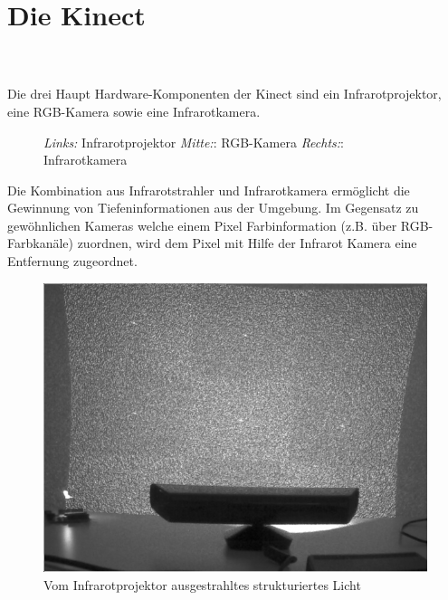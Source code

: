 \chapter{Die Kinect}
\label{ch:kinect}
\\\\
Die drei Haupt Hardware-Komponenten der Kinect sind ein Infrarotprojektor, eine RGB-Kamera sowie eine Infrarotkamera.
\begin{figure}[!ht]
  \centering
   \caption{\emph {Links:} Infrarotprojektor \emph {Mitte:}: RGB-Kamera  \emph {Rechts:}: Infrarotkamera }
\end{figure}
Die Kombination aus Infrarotstrahler und Infrarotkamera ermöglicht die Gewinnung von Tiefeninformationen aus der Umgebung. Im Gegensatz zu gewöhnlichen Kameras welche einem Pixel Farbinformation (z.B.  über RGB-Farbkanäle) zuordnen, wird dem Pixel mit Hilfe der Infrarot Kamera eine Entfernung zugeordnet.
\begin{figure}
\centering
\includegraphics[width=0.5\linewidth]{./Res/Kinect_9Points}
\caption{Vom Infrarotprojektor ausgestrahltes strukturiertes Licht}
\label{fig:Kinect_9Points}
\end{figure}

